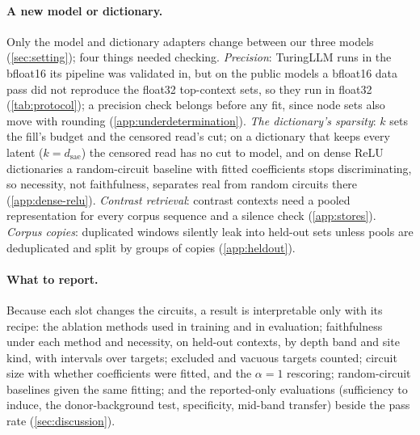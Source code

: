 \paragraph{A new model or dictionary.}
Only the model and dictionary adapters change between our three models (\cref{sec:setting}); four things needed checking.
\emph{Precision}: TuringLLM runs in the bfloat16 its pipeline was validated in, but on the public models a bfloat16 data pass did not reproduce the float32 top-context sets, so they run in float32 (\cref{tab:protocol}); a precision check belongs before any fit, since node sets also move with rounding (\cref{app:underdetermination}).
\emph{The dictionary's sparsity}: $k$ sets the fill's budget and the censored read's cut; on a dictionary that keeps every latent ($k = d_{\mathrm{sae}}$) the censored read has no cut to model, and on dense ReLU dictionaries a random-circuit baseline with fitted coefficients stops discriminating, so necessity, not faithfulness, separates real from random circuits there (\cref{app:dense-relu}).
\emph{Contrast retrieval}: contrast contexts need a pooled representation for every corpus sequence and a silence check (\cref{app:stores}).
\emph{Corpus copies}: duplicated windows silently leak into held-out sets unless pools are deduplicated and split by groups of copies (\cref{app:heldout}).

\paragraph{What to report.}
Because each slot changes the circuits, a result is interpretable only with its recipe: the ablation methods used in training and in evaluation; faithfulness under each method and necessity, on held-out contexts, by depth band and site kind, with intervals over targets; excluded and vacuous targets counted; circuit size with whether coefficients were fitted, and the $\alpha = 1$ rescoring; random-circuit baselines given the same fitting; and the reported-only evaluations (sufficiency to induce, the donor-background test, specificity, mid-band transfer) beside the pass rate (\cref{sec:discussion}).


